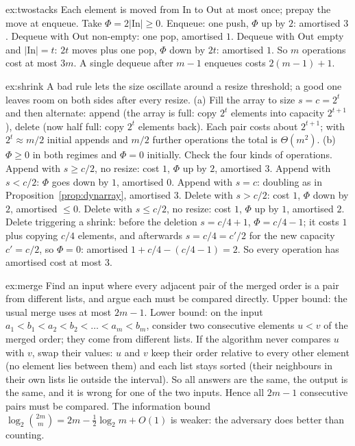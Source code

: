 \begin{solution}{ex:twostacks}
\idea Each element is moved from $\mathrm{In}$ to $\mathrm{Out}$ at most once; prepay the move at enqueue.
\writeup Take $\Phi=2|\mathrm{In}|\ge0$. Enqueue: one push, $\Phi$ up by $2$: amortised $3$. Dequeue with $\mathrm{Out}$ non-empty: one pop, amortised $1$.
Dequeue with $\mathrm{Out}$ empty and $|\mathrm{In}|=t$: $2t$ moves plus one pop, $\Phi$ down by $2t$: amortised $1$. So $m$ operations cost at most
$3m$. A single dequeue after $m-1$ enqueues costs $2(m-1)+1$.
\end{solution}

\begin{solution}{ex:shrink}
\idea A bad rule lets the size oscillate around a resize threshold; a good one leaves room on both sides after every resize.
\writeup (a) Fill the array to size $s=c=2^t$ and then alternate: append (the array is full: copy $2^t$ elements into capacity $2^{t+1}$), delete
(now half full: copy $2^t$ elements back). Each pair costs about $2^{t+1}$; with $2^t\approx m/2$ initial appends and $m/2$ further operations the
total is $\Theta(m^2)$. (b) $\Phi\ge0$ in both regimes and $\Phi=0$ initially. Check the four kinds of operations. Append with $s\ge c/2$, no
resize: cost $1$, $\Phi$ up by $2$, amortised $3$. Append with $s<c/2$: $\Phi$ goes down by $1$, amortised $0$. Append with $s=c$: doubling as in
Proposition~\ref{prop:dynarray}, amortised $3$. Delete with $s>c/2$: cost $1$, $\Phi$ down by $2$, amortised $\le0$. Delete with $s\le c/2$, no resize:
cost $1$, $\Phi$ up by $1$, amortised $2$. Delete triggering a shrink: before the deletion $s=c/4+1$, $\Phi=c/4-1$; it costs $1$ plus copying $c/4$ elements,
and afterwards $s=c/4=c'/2$ for the new capacity $c'=c/2$, so $\Phi=0$: amortised $1+c/4-(c/4-1)=2$. So every operation has amortised cost at most $3$.
\end{solution}

\begin{solution}{ex:merge}
\idea Find an input where every adjacent pair of the merged order is a pair from different lists, and argue each must be compared directly.
\writeup Upper bound: the usual merge uses at most $2m-1$. Lower bound: on the input $a_1<b_1<a_2<b_2<\dots<a_m<b_m$, consider two consecutive elements
$u<v$ of the merged order; they come from different lists. If the algorithm never compares $u$ with $v$, swap their values: $u$ and $v$ keep
their order relative to every other element (no element lies between them) and each list stays sorted (their neighbours in their own lists
lie outside the interval). So all answers are the same, the output is the same, and it is wrong for one of the two inputs. Hence all $2m-1$
consecutive pairs must be compared. The information bound $\log_2\binom{2m}{m}=2m-\frac12\log_2m+O(1)$ is weaker: the adversary does better than
counting.
\end{solution}

